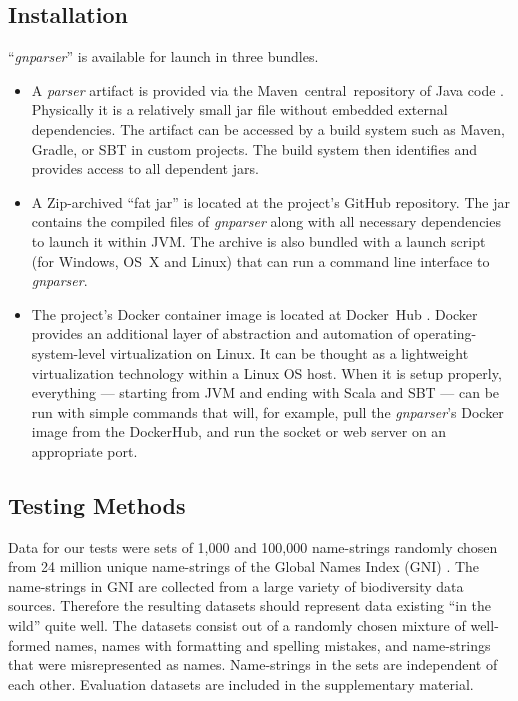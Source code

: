 \documentclass{bmcart}
\begin{document}
\subsection*{Installation}

``\textit{gnparser}'' is available for launch in three bundles.

\begin{itemize} \item A \textit{parser} artifact is provided via the Maven~central~repository of Java code \cite{maven-globalnames}. Physically it is a relatively small jar file without embedded external dependencies. The artifact can be accessed by a build system such as Maven, Gradle, or SBT in custom projects. The build system then identifies and provides access to all dependent jars.

  \item A Zip-archived ``fat jar'' is located at the project's GitHub repository. The jar contains the compiled files of \textit{gnparser} along with all necessary dependencies to launch it within JVM\@. The archive is also bundled with a launch script (for Windows, OS~X and Linux) that can run a command line interface to \textit{gnparser}.

  \item The project's Docker container image is located at Docker~Hub \cite{gnparser-docker}. Docker provides an additional layer of abstraction and automation of operating-system-level virtualization on Linux. It can be thought as a lightweight virtualization technology within a Linux OS host.  When it is setup properly, everything --- starting from JVM and ending with Scala and SBT --- can be run with simple commands that will, for example, pull the \textit{gnparser}'s Docker image from the DockerHub, and run the socket or web server on an appropriate port.

\end{itemize}

\subsection*{Testing Methods}


Data for our tests were sets of 1,000 and 100,000 name-strings randomly chosen from 24 million unique name-strings of the Global Names Index (GNI) \cite{gn:index}. The name-strings in GNI are collected from a large variety of biodiversity data sources. Therefore the resulting datasets should represent data existing ``in the wild'' quite well. The datasets consist out of a randomly chosen mixture of well-formed names, names with formatting and spelling mistakes, and name-strings that were misrepresented as names. Name-strings in the sets are independent of each other. Evaluation datasets are included in the supplementary material.
\end{document}
